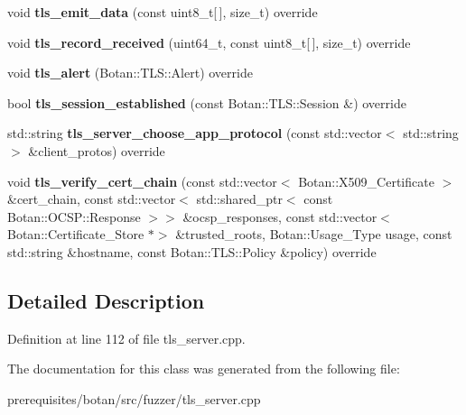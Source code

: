 \begin{DoxyCompactItemize}
\item 
\mbox{\label{class_fuzzer___t_l_s___server___callbacks_ad9ec638250b492e1444e5e05d04240ac}} 
void {\bfseries tls\+\_\+emit\+\_\+data} (const uint8\+\_\+t\mbox{[}$\,$\mbox{]}, size\+\_\+t) override
\item 
\mbox{\label{class_fuzzer___t_l_s___server___callbacks_af182f7651627952714713222efb1cbdd}} 
void {\bfseries tls\+\_\+record\+\_\+received} (uint64\+\_\+t, const uint8\+\_\+t\mbox{[}$\,$\mbox{]}, size\+\_\+t) override
\item 
\mbox{\label{class_fuzzer___t_l_s___server___callbacks_a9134c69d519f09237095476192bd55d8}} 
void {\bfseries tls\+\_\+alert} (Botan\+::\+T\+L\+S\+::\+Alert) override
\item 
\mbox{\label{class_fuzzer___t_l_s___server___callbacks_ac8b3eb04689fb29dbc674e20adb160a4}} 
bool {\bfseries tls\+\_\+session\+\_\+established} (const Botan\+::\+T\+L\+S\+::\+Session \&) override
\item 
\mbox{\label{class_fuzzer___t_l_s___server___callbacks_a32b0ef7baf757cb31b5df06531cf1ab5}} 
std\+::string {\bfseries tls\+\_\+server\+\_\+choose\+\_\+app\+\_\+protocol} (const std\+::vector$<$ std\+::string $>$ \&client\+\_\+protos) override
\item 
\mbox{\label{class_fuzzer___t_l_s___server___callbacks_a3d808dcff47cf94778669fd1d18d778e}} 
void {\bfseries tls\+\_\+verify\+\_\+cert\+\_\+chain} (const std\+::vector$<$ Botan\+::\+X509\+\_\+\+Certificate $>$ \&cert\+\_\+chain, const std\+::vector$<$ std\+::shared\+\_\+ptr$<$ const Botan\+::\+O\+C\+S\+P\+::\+Response $>$$>$ \&ocsp\+\_\+responses, const std\+::vector$<$ Botan\+::\+Certificate\+\_\+\+Store $\ast$$>$ \&trusted\+\_\+roots, Botan\+::\+Usage\+\_\+\+Type usage, const std\+::string \&hostname, const Botan\+::\+T\+L\+S\+::\+Policy \&policy) override
\end{DoxyCompactItemize}


\subsection{Detailed Description}


Definition at line 112 of file tls\+\_\+server.\+cpp.



The documentation for this class was generated from the following file\+:\begin{DoxyCompactItemize}
\item 
prerequisites/botan/src/fuzzer/tls\+\_\+server.\+cpp\end{DoxyCompactItemize}
